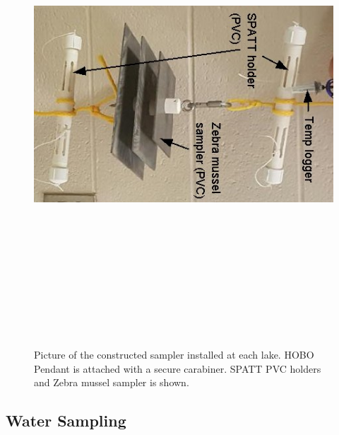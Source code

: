 \begin{figure}[!h]
\centering
\includegraphics[width=\textwidth, height=18cm]{figures/samplers}
\caption{Picture of the constructed sampler installed at each lake. HOBO Pendant is attached with a secure carabiner. SPATT PVC holders and Zebra mussel sampler is shown.}
\label{fig:samplerr}
\end{figure}

\clearpage
\subsection{Water Sampling} \label{sampling}

